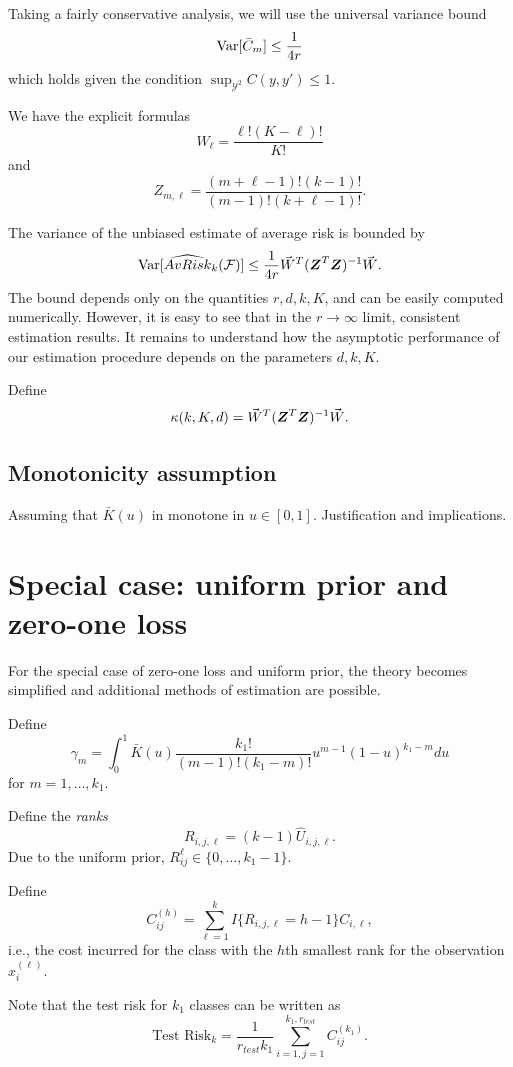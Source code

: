 \documentclass[12pt]{article}
\begin{document}
Taking a fairly conservative analysis, we will use the universal variance bound
\[
\text{Var}[\bar{C}_m] \leq \frac{1}{4r}
\]
which holds given the condition $\sup_{\mathcal{Y}^2} C(y, y') \leq 1.$

We have the explicit formulas
\[
W_\ell = \frac{\ell!(K-\ell)!}{K!}
\]
and
\[
Z_{m, \ell} = \frac{(m+\ell-1)!(k-1)!}{(m-1)!(k+\ell-1)!}.
\]

The variance of the unbiased estimate of average risk is bounded by
\[
\text{Var}[\widehat{AvRisk}_k(\mathcal{F})] \leq \frac{1}{4r} \vec{W}^T (\boldsymbol{Z}^T \boldsymbol{Z})^{-1} \vec{W}.
\]
The bound depends only on the quantities $r, d, k, K$, and can be
easily computed numerically.  However, it is easy to see that in the
$r \to \infty$ limit, consistent estimation results.  It remains to
understand how the asymptotic performance of our estimation procedure
depends on the parameters $d, k, K$.

Define
\[
\kappa(k, K, d) = \vec{W}^T (\boldsymbol{Z}^T \boldsymbol{Z})^{-1} \vec{W}.
\]


\subsection{Monotonicity assumption}

Assuming that $\bar{K}(u)$ in monotone in $u \in [0,1]$.
Justification and implications.

\section{Special case: uniform prior and zero-one loss}\label{sec:sp_case}

For the special case of zero-one loss and uniform prior, the theory
becomes simplified and additional methods of estimation are possible.

Define
\[
\gamma_m = \int_0^1 \bar{K}(u)  \frac{k_1!}{(m-1)!(k_1-m)!} u^{m-1} (1-u)^{k_1-m} du
\]
for $m = 1,\hdots, k_1$.

Define the \emph{ranks}
\[
R_{i, j, \ell} = (k-1)\hat{U}_{i, j, \ell}.
\]
Due to the uniform prior, $R_{ij}^\ell \in \{0,\hdots, k_1-1\}$.

Define
\[
C_{ij}^{(h)} = \sum_{\ell=1}^k I\{R_{i, j, \ell} = h - 1\} C_{i, \ell},
\]
i.e., the cost incurred for the class with the $h$th smallest rank for
the observation $x_i^{(\ell)}$.

Note that the test risk for $k_1$ classes can be written as
\[
\text{Test Risk}_k = \frac{1}{r_{test}k_1}\sum_{i=1,j=1}^{k_1,r_{test}} C_{ij}^{(k_1)}.
\]
\end{document}
